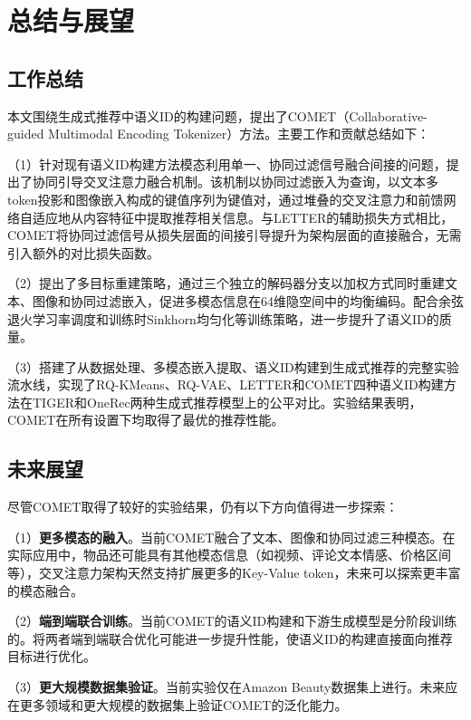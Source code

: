 
\chapter{总结与展望}

\section{工作总结}

本文围绕生成式推荐中语义ID的构建问题，提出了COMET（Collaborative-guided Multimodal Encoding Tokenizer）方法。主要工作和贡献总结如下：

（1）针对现有语义ID构建方法模态利用单一、协同过滤信号融合间接的问题，提出了协同引导交叉注意力融合机制。该机制以协同过滤嵌入为查询，以文本多token投影和图像嵌入构成的键值序列为键值对，通过堆叠的交叉注意力和前馈网络自适应地从内容特征中提取推荐相关信息。与LETTER的辅助损失方式相比，COMET将协同过滤信号从损失层面的间接引导提升为架构层面的直接融合，无需引入额外的对比损失函数。

（2）提出了多目标重建策略，通过三个独立的解码器分支以加权方式同时重建文本、图像和协同过滤嵌入，促进多模态信息在64维隐空间中的均衡编码。配合余弦退火学习率调度和训练时Sinkhorn均匀化等训练策略，进一步提升了语义ID的质量。

（3）搭建了从数据处理、多模态嵌入提取、语义ID构建到生成式推荐的完整实验流水线，实现了RQ-KMeans、RQ-VAE、LETTER和COMET四种语义ID构建方法在TIGER和OneRec两种生成式推荐模型上的公平对比。实验结果表明，COMET在所有设置下均取得了最优的推荐性能。

\section{未来展望}

尽管COMET取得了较好的实验结果，仍有以下方向值得进一步探索：

（1）\textbf{更多模态的融入}。当前COMET融合了文本、图像和协同过滤三种模态。在实际应用中，物品还可能具有其他模态信息（如视频、评论文本情感、价格区间等），交叉注意力架构天然支持扩展更多的Key-Value token，未来可以探索更丰富的模态融合。

（2）\textbf{端到端联合训练}。当前COMET的语义ID构建和下游生成模型是分阶段训练的。将两者端到端联合优化可能进一步提升性能，使语义ID的构建直接面向推荐目标进行优化。

（3）\textbf{更大规模数据集验证}。当前实验仅在Amazon Beauty数据集上进行。未来应在更多领域和更大规模的数据集上验证COMET的泛化能力。
